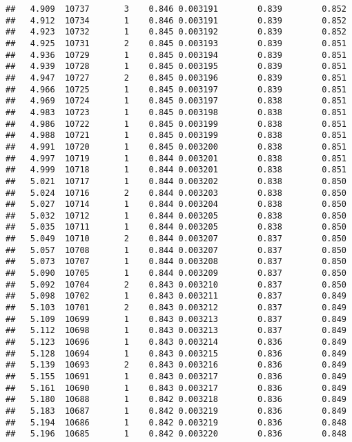 \documentclass[
]{book}
\begin{document}
\begin{verbatim}
##   4.909  10737       3    0.846 0.003191        0.839        0.852
##   4.912  10734       1    0.846 0.003191        0.839        0.852
##   4.923  10732       1    0.845 0.003192        0.839        0.852
##   4.925  10731       2    0.845 0.003193        0.839        0.851
##   4.936  10729       1    0.845 0.003194        0.839        0.851
##   4.939  10728       1    0.845 0.003195        0.839        0.851
##   4.947  10727       2    0.845 0.003196        0.839        0.851
##   4.966  10725       1    0.845 0.003197        0.839        0.851
##   4.969  10724       1    0.845 0.003197        0.838        0.851
##   4.983  10723       1    0.845 0.003198        0.838        0.851
##   4.986  10722       1    0.845 0.003199        0.838        0.851
##   4.988  10721       1    0.845 0.003199        0.838        0.851
##   4.991  10720       1    0.845 0.003200        0.838        0.851
##   4.997  10719       1    0.844 0.003201        0.838        0.851
##   4.999  10718       1    0.844 0.003201        0.838        0.851
##   5.021  10717       1    0.844 0.003202        0.838        0.850
##   5.024  10716       2    0.844 0.003203        0.838        0.850
##   5.027  10714       1    0.844 0.003204        0.838        0.850
##   5.032  10712       1    0.844 0.003205        0.838        0.850
##   5.035  10711       1    0.844 0.003205        0.838        0.850
##   5.049  10710       2    0.844 0.003207        0.837        0.850
##   5.057  10708       1    0.844 0.003207        0.837        0.850
##   5.073  10707       1    0.844 0.003208        0.837        0.850
##   5.090  10705       1    0.844 0.003209        0.837        0.850
##   5.092  10704       2    0.843 0.003210        0.837        0.850
##   5.098  10702       1    0.843 0.003211        0.837        0.849
##   5.103  10701       2    0.843 0.003212        0.837        0.849
##   5.109  10699       1    0.843 0.003213        0.837        0.849
##   5.112  10698       1    0.843 0.003213        0.837        0.849
##   5.123  10696       1    0.843 0.003214        0.836        0.849
##   5.128  10694       1    0.843 0.003215        0.836        0.849
##   5.139  10693       2    0.843 0.003216        0.836        0.849
##   5.155  10691       1    0.843 0.003217        0.836        0.849
##   5.161  10690       1    0.843 0.003217        0.836        0.849
##   5.180  10688       1    0.842 0.003218        0.836        0.849
##   5.183  10687       1    0.842 0.003219        0.836        0.849
##   5.194  10686       1    0.842 0.003219        0.836        0.848
##   5.196  10685       1    0.842 0.003220        0.836        0.848

\end{verbatim}
\end{document}
